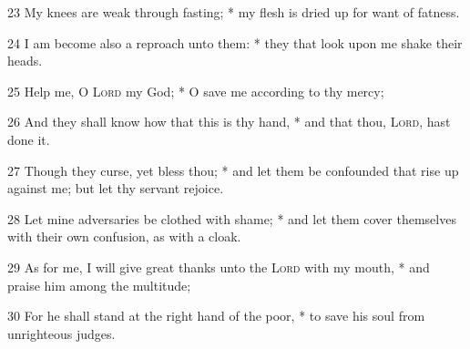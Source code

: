 23 My knees are weak through fasting; * my flesh is dried up for want of fatness.\par
24 I am become also a reproach unto them: * they that look upon me shake their heads.\par
25 Help me, O {\textsc{Lord}} my God; * O save me according to thy mercy;\par
26 And they shall know how that this is thy hand, * and that thou, {\textsc{Lord}}, hast done it.\par
27 Though they curse, yet bless thou; * and let them be confounded that rise up against me; but let thy servant rejoice.\par
28 Let mine adversaries be clothed with shame; * and let them cover themselves with their own confusion, as with a cloak.\par
29 As for me, I will give great thanks unto the {\textsc{Lord}} with my mouth, * and praise him among the multitude;\par
30 For he shall stand at the right hand of the poor, * to save his soul from unrighteous judges.
